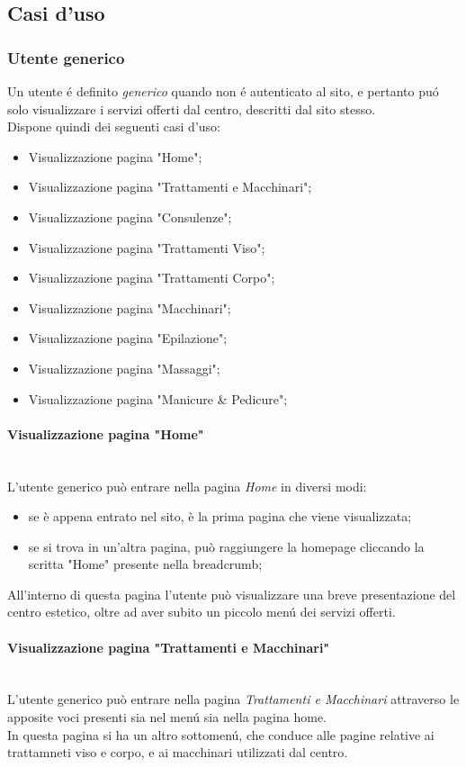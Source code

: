 \documentclass[]{article}
\begin{document}
\subsection{Casi d'uso}
\subsubsection{Utente generico}
Un utente é definito \textit{generico} quando non é autenticato al sito, e pertanto puó solo visualizzare i servizi offerti dal centro, descritti dal sito stesso.\\
Dispone quindi dei seguenti casi d'uso:
\begin{itemize}
	\item Visualizzazione pagina "Home";
	\item Visualizzazione pagina "Trattamenti e Macchinari";
	\item Visualizzazione pagina "Consulenze";
	\item Visualizzazione pagina "Trattamenti Viso";
	\item Visualizzazione pagina "Trattamenti Corpo";
	\item Visualizzazione pagina "Macchinari";
	\item Visualizzazione pagina "Epilazione";
	\item Visualizzazione pagina "Massaggi";
	\item Visualizzazione pagina "Manicure \& Pedicure";
\end{itemize}
\paragraph{Visualizzazione pagina "Home"}\mbox{}\\
L'utente generico può entrare nella pagina \textit{Home} in diversi modi:
\begin{itemize}
	\item se è appena entrato nel sito, è la prima pagina che viene visualizzata;
	\item se si trova in un'altra pagina, può raggiungere la homepage cliccando la scritta "Home" presente nella breadcrumb;
\end{itemize}
All'interno di questa pagina l'utente può visualizzare una breve presentazione del centro estetico, oltre ad aver subito un piccolo menú dei servizi offerti.

\paragraph{Visualizzazione pagina "Trattamenti e Macchinari"}\mbox{}\\
L'utente generico può entrare nella pagina \textit{Trattamenti e Macchinari} attraverso le apposite voci presenti sia nel menú sia nella pagina home.\\
In questa pagina si ha un altro sottomenú, che conduce alle pagine relative ai trattamneti viso e corpo, e ai macchinari utilizzati dal centro.
\end{document}

